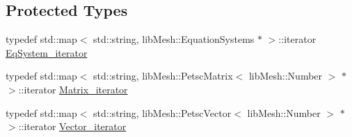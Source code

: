 \subsection*{Protected Types}
\begin{DoxyCompactItemize}
\item 
typedef std\+::map$<$ std\+::string, lib\+Mesh\+::\+Equation\+Systems $\ast$ $>$\+::iterator \hyperlink{classcarl_1_1assemble__coupling__matrices_a2c14330f6dd8399037d78458bb27b4f4}{Eq\+System\+\_\+iterator}
\item 
typedef std\+::map$<$ std\+::string, lib\+Mesh\+::\+Petsc\+Matrix$<$ lib\+Mesh\+::\+Number $>$ $\ast$ $>$\+::iterator \hyperlink{classcarl_1_1assemble__coupling__matrices_a14c35d63e9e2980a32a6255ca963ab09}{Matrix\+\_\+iterator}
\item 
typedef std\+::map$<$ std\+::string, lib\+Mesh\+::\+Petsc\+Vector$<$ lib\+Mesh\+::\+Number $>$ $\ast$ $>$\+::iterator \hyperlink{classcarl_1_1assemble__coupling__matrices_a3d5b883bf64512930c7e6efcad06c60d}{Vector\+\_\+iterator}
\end{DoxyCompactItemize}
